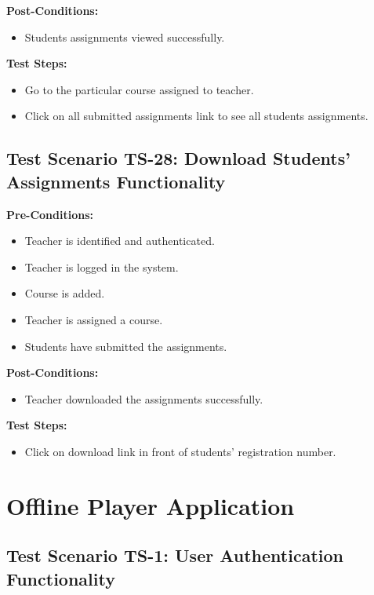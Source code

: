 \textbf{Post-Conditions: }
\begin{itemize}
\item Students assignments viewed successfully.

\end{itemize}
\textbf{Test Steps:}
\begin{itemize}

\item Go to the particular course assigned to teacher.
\item Click on all submitted assignments link to see all students assignments.

\end{itemize}


\subsection{Test Scenario TS-28: Download Students' Assignments Functionality}
\textbf{Pre-Conditions: }
\begin{itemize}

\item Teacher is identified and authenticated.
\item Teacher is logged in the system.
\item Course is added.
\item Teacher is assigned a course.
\item Students have submitted the assignments.

\end{itemize}

\textbf{Post-Conditions: }
\begin{itemize}
\item Teacher downloaded the assignments successfully.

\end{itemize}
\textbf{Test Steps:}
\begin{itemize}

\item Click on download link in front of students' registration number.

\end{itemize}

\section{Offline Player Application}
\subsection{Test Scenario TS-1: User Authentication Functionality}

